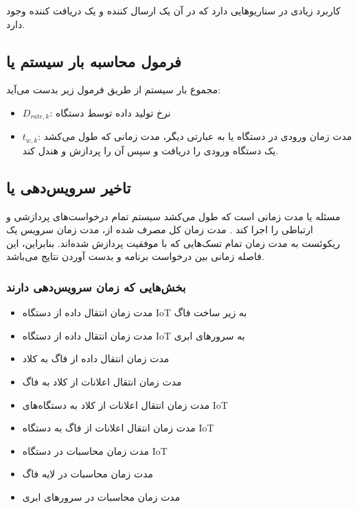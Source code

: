 \documentclass[a4paper]{article}
\begin{document}
کاربرد زیادی در سناریو‌هایی دارد که در آن یک ارسال کننده و یک دریافت کننده وجود
دارد.

\subsection{فرمول محاسبه بار سیستم یا }

مجموع بار سیستم از طریق فرمول زیر بدست می‌آید:


\begin{itemize}
    \item $D_{rate, k}$: نرخ تولید داده توسط دستگاه 
    \item $t_{w, k}$: مدت زمان ورودی در دستگاه  یا به عبارتی دیگر، مدت
    زمانی که طول می‌کشد یک دستگاه  ورودی را دریافت و سپس آن را پردازش و
    هندل کند.
\end{itemize}

\subsection{تاخیر سرویس‌دهی یا }

مسئله  یا  مدت زمانی
است که طول می‌کشد سیستم  تمام درخواست‌های پردازشی و ارتباطی را اجرا کند
. مدت زمان کل مصرف شده از، مدت زمان سرویس
یک ریکوئست به مدت زمان تمام تسک‌هایی که با موفقیت پردازش شده‌اند. بنابراین، این
فاصله زمانی بین درخواست برنامه و بدست آوردن نتایج می‌باشد.

\subsubsection{بخش‌هایی که زمان سرویس‌دهی دارند}

\begin{itemize}
    \item مدت زمان انتقال داده از دستگاه IoT به زیر ساخت فاگ
    \item مدت زمان انتقال داده از دستگاه IoT به سرور‌های ابری
    \item مدت زمان انتقال داده از فاگ به کلاد
    \item مدت زمان انتقال اعلانات از کلاد به فاگ
    \item مدت زمان انتقال اعلانات از کلاد به دستگاه‌های IoT
    \item مدت زمان انتقال اعلانات از فاگ به دستگاه IoT
    \item مدت زمان محاسبات در دستگاه IoT
    \item مدت زمان محاسبات در لایه فاگ
    \item مدت زمان محاسبات در سرور‌های ابری
\end{itemize}
\end{document}
